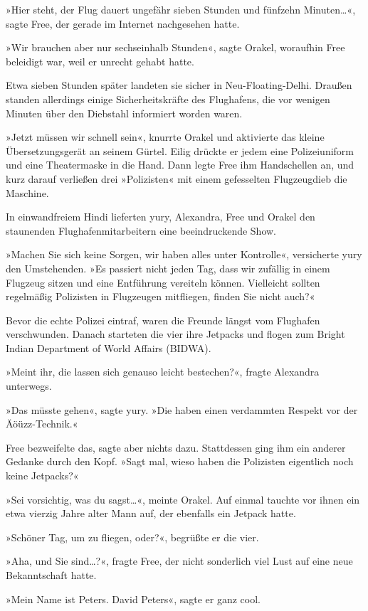 »Hier steht, der Flug dauert ungefähr sieben Stunden und fünfzehn Minuten…«, sagte Free, der gerade im Internet nachgesehen hatte.

»Wir brauchen aber nur sechseinhalb Stunden«, sagte Orakel, woraufhin Free beleidigt war, weil er unrecht gehabt hatte.

Etwa sieben Stunden später landeten sie sicher in Neu-Floating-Delhi. Draußen standen allerdings einige Sicherheitskräfte des Flughafens, die vor wenigen Minuten über den Diebstahl informiert worden waren.

»Jetzt müssen wir schnell sein«, knurrte Orakel und aktivierte das kleine Übersetzungsgerät an seinem Gürtel. Eilig drückte er jedem eine Polizeiuniform und eine Theatermaske in die Hand. Dann legte Free ihm Handschellen an, und kurz darauf verließen drei »Polizisten« mit einem gefesselten Flugzeugdieb die Maschine.

In einwandfreiem Hindi lieferten yury, Alexandra, Free und Orakel den staunenden Flughafenmitarbeitern eine beeindruckende Show.

»Machen Sie sich keine Sorgen, wir haben alles unter Kontrolle«, versicherte yury den Umstehenden. »Es passiert nicht jeden Tag, dass wir zufällig in einem Flugzeug sitzen und eine Entführung vereiteln können. Vielleicht sollten regelmäßig Polizisten in Flugzeugen mitfliegen, finden Sie nicht auch?«

Bevor die echte Polizei eintraf, waren die Freunde längst vom Flughafen verschwunden. Danach starteten die vier ihre Jetpacks und flogen zum Bright Indian Department of World Affairs (BIDWA).

»Meint ihr, die lassen sich genauso leicht bestechen?«, fragte Alexandra unterwegs.

»Das müsste gehen«, sagte yury. »Die haben einen verdammten Respekt vor der Äöüzz-Technik.«

Free bezweifelte das, sagte aber nichts dazu. Stattdessen ging ihm ein anderer Gedanke durch den Kopf. »Sagt mal, wieso haben die Polizisten eigentlich noch keine Jetpacks?«

»Sei vorsichtig, was du sagst…«, meinte Orakel. Auf einmal tauchte vor ihnen ein etwa vierzig Jahre alter Mann auf, der ebenfalls ein Jetpack hatte.

»Schöner Tag, um zu fliegen, oder?«, begrüßte er die vier.

»Aha, und Sie sind…?«, fragte Free, der nicht sonderlich viel Lust auf eine neue Bekanntschaft hatte.

»Mein Name ist Peters. David Peters«, sagte er ganz cool.

